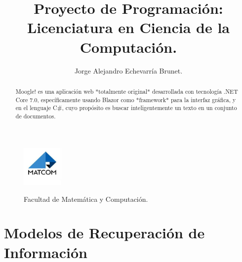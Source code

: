 \documentclass{article}
\begin{document}
\title{Proyecto de Programación:\\ Licenciatura en Ciencia de la Computación.}
\author{Jorge Alejandro Echevarría Brunet.}
\date{}
\maketitle

\begin{figure}[h]
	\center
	\includegraphics[width=2cm]{matcom.jpg}
	\label{fig:logo}

	\begin{center}
		\Large Facultad de Matemática y Computación.
	\end{center}
\end{figure}

\begin{abstract}
	Moogle! es una aplicación web *totalmente original* desarrollada con tecnología
	.NET Core 7.0, específicamente usando Blazor como *framework* para la interfaz
	gráfica, y en el lenguaje C\#, cuyo propósito es buscar inteligentemente un texto
	en un conjunto de documentos.
\end{abstract}


\section*{Modelos de Recuperación de Información}
\end{document}
